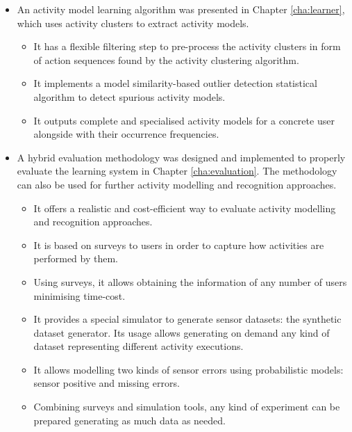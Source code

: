 \begin{itemize}
 \item An activity model learning algorithm was presented in Chapter \ref{cha:learner}, which uses activity clusters to extract activity models.
 \begin{itemize}
  \item It has a flexible filtering step to pre-process the activity clusters in form of action sequences found by the activity clustering algorithm.
  \item It implements a model similarity-based outlier detection statistical algorithm to detect spurious activity models.
  \item It outputs complete and specialised activity models for a concrete user alongside with their occurrence frequencies.
 \end{itemize}

 \item A hybrid evaluation methodology was designed and implemented to properly evaluate the learning system in Chapter \ref{cha:evaluation}. The methodology can also be used for further activity modelling and recognition approaches.
 \begin{itemize}
  \item It offers a realistic and cost-efficient way to evaluate activity modelling and recognition approaches.
  \item It is based on surveys to users in order to capture how activities are performed by them.
  \item Using surveys, it allows obtaining the information of any number of users minimising time-cost.
  \item It provides a special simulator to generate sensor datasets: the synthetic dataset generator. Its usage allows generating on demand any kind of dataset representing different activity executions.
  \item It allows modelling two kinds of sensor errors using probabilistic models: sensor positive and missing errors.
  \item Combining surveys and simulation tools, any kind of experiment can be prepared generating as much data as needed.
 \end{itemize}

\end{itemize}
